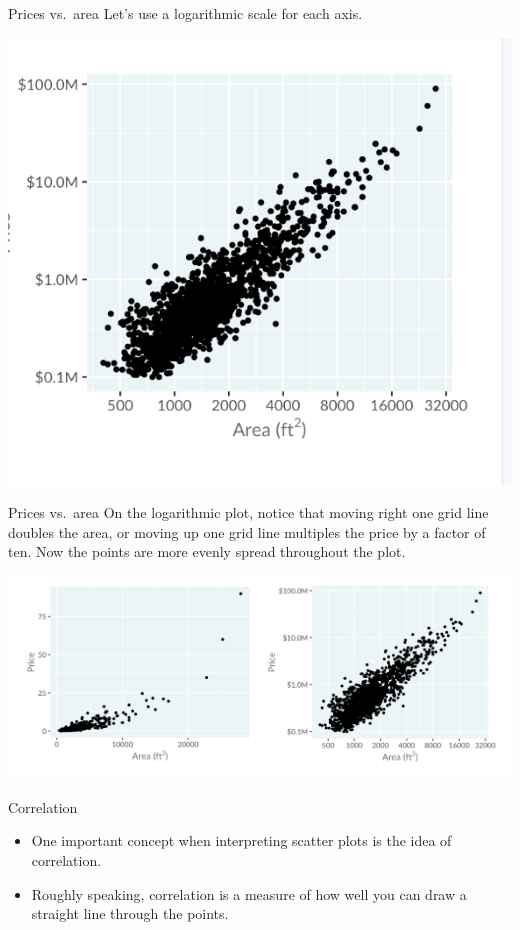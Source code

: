 \documentclass[
  ignorenonframetext,
]{beamer}
\begin{document}
\begin{frame}{Prices vs.~area}
\label{prices-vs.-area-2}
Let's use a logarithmic scale for each axis.

\includegraphics{../images/im32.png}
\end{frame}

\begin{frame}{Prices vs.~area}
\label{prices-vs.-area-3}
On the logarithmic plot, notice that moving right one grid line doubles
the area, or moving up one grid line multiples the price by a factor of
ten. Now the points are more evenly spread throughout the plot.

\includegraphics{../images/im33.png}
\end{frame}

\begin{frame}{Correlation}
\label{correlation}
\begin{itemize}
\item
  One important concept when interpreting scatter plots is the idea of
  correlation.
\item
  Roughly speaking, correlation is a measure of how well you can draw a
  straight line through the points.
\end{itemize}
\end{frame}
\end{document}

